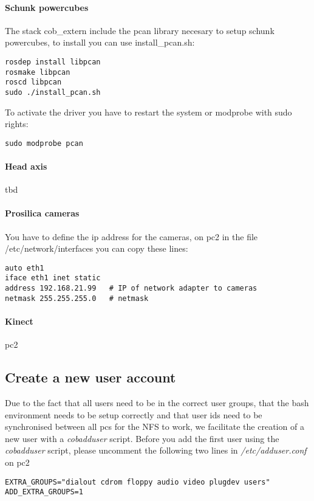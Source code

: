 \paragraph{Schunk powercubes}
The stack cob\_extern include the pcan library necesary to setup schunk powercubes, to install you can use install\_pcan.sh: 
\begin{lstlisting}
rosdep install libpcan
rosmake libpcan
roscd libpcan
sudo ./install_pcan.sh
\end{lstlisting}

To activate the driver you have to restart the system or modprobe with sudo rights: 
\begin{lstlisting}
sudo modprobe pcan
\end{lstlisting}

\paragraph{Head axis}
tbd

\paragraph{Prosilica cameras}
You have to define the ip address for the cameras, on pc2 in the file /etc/network/interfaces you can copy these lines:
\begin{lstlisting}
auto eth1 
iface eth1 inet static
address 192.168.21.99   # IP of network adapter to cameras 
netmask 255.255.255.0   # netmask
\end{lstlisting}

\paragraph{Kinect}
pc2


\subsection{Create a new user account}
\label{sec:account}
Due to the fact that all users need to be in the correct user groups, that the bash environment needs to be setup correctly and that user ids need to be synchronised between all pcs for the NFS to work, we facilitate the creation of a new user with a \textit{cobadduser} script. Before you add the first user using the \textit{cobadduser} script, please uncomment the following two lines in \textit{/etc/adduser.conf} on pc2
\begin{lstlisting}
EXTRA_GROUPS="dialout cdrom floppy audio video plugdev users"
ADD_EXTRA_GROUPS=1
\end{lstlisting}

